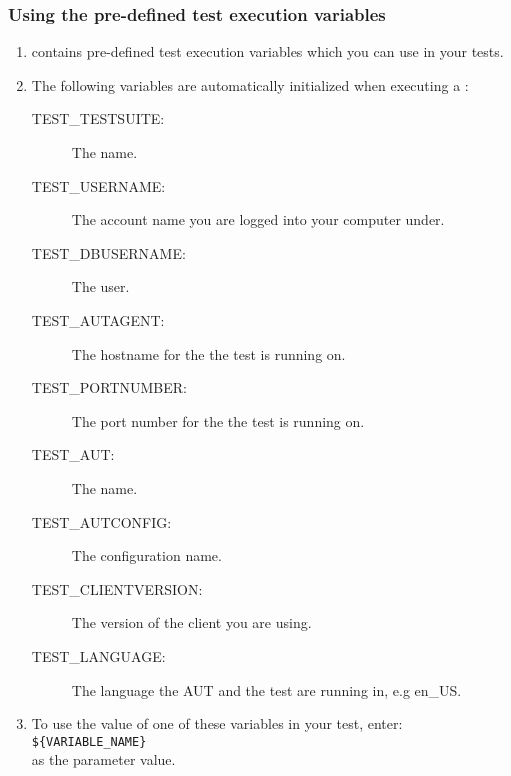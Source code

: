 \subsubsection{Using the \app{} pre-defined test execution variables}
\label{TasksPredefinedVariables}

\begin{enumerate}
\item \app{} contains pre-defined test execution variables which you can use in your tests. 
\item The following variables are automatically initialized when executing a \gdsuite{}:
 \begin{description}
 \item [TEST\_TESTSUITE:]{The \gdsuite{} name.}
 \item [TEST\_USERNAME:]{The account name you are logged into your computer under.}
 \item [TEST\_DBUSERNAME:]{The \gddb{} user.}
 \item [TEST\_AUTAGENT:]{The hostname for the \gdagent{} the test is running on.}
 \item [TEST\_PORTNUMBER:]{The port number for the \gdagent{} the test is running on.}
 \item [TEST\_AUT:]{The \gdaut{} name.}
 \item [TEST\_AUTCONFIG:]{The \gdaut{} configuration name.}
 \item [TEST\_CLIENTVERSION:]{The version of the \app{} client you are using.}
 \item [TEST\_LANGUAGE:]{The language the AUT and the test are running in, e.g en\_US. }
 \end{description}
\item To use the value of one of these variables in your test, enter: \\
\verb+${VARIABLE_NAME}+\\
as the parameter value. 
\end{enumerate}

